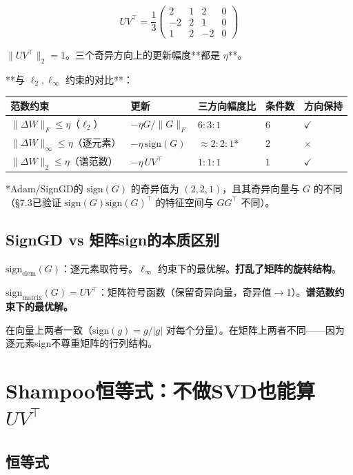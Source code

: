 \documentclass[12pt,a4paper]{article}
\begin{document}
\[UV^\top = \frac{1}{3}\begin{pmatrix}2&1&2&0\\-2&2&1&0\\1&2&-2&0\end{pmatrix}\]

$\|UV^\top\|_2 = 1$。三个奇异方向上的更新幅度**都是 $\eta$**。

**与 $\ell_2, \ell_\infty$ 约束的对比**：






\begin{center}\small
\begin{longtable}{|l|l|l|l|l|}
\hline
范数约束 & 更新 & 三方向幅度比 & 条件数 & 方向保持 \\
\hline
$\|\Delta W\|_F \le \eta$（$\ell_2$） & $-\eta G/\|G\|_F$ & $6:3:1$ & $6$ & $\checkmark$ \\
$\|\Delta W\|_\infty \le \eta$（逐元素） & $-\eta\,\text{sign}(G)$ & $\approx 2:2:1$* & $2$ & \textbf{$\times$} \\
$\|\Delta W\|_2 \le \eta$（谱范数） & $-\eta\,UV^\top$ & $1:1:1$ & $1$ & $\checkmark$ \\
\hline
\end{longtable}
\end{center}


*Adam/SignGD的 $\text{sign}(G)$ 的奇异值为 $(2,2,1)$，且其奇异向量与 $G$ 的不同（§7.3已验证 $\text{sign}(G)\text{sign}(G)^\top$ 的特征空间与 $GG^\top$ 不同）。


\subsection{SignGD vs 矩阵sign的本质区别}

$\text{sign}_{\text{elem}}(G)$：逐元素取符号。$\ell_\infty$ 约束下的最优解。\textbf{打乱了矩阵的旋转结构}。

$\text{sign}_{\text{matrix}}(G) = UV^\top$：矩阵符号函数（保留奇异向量，奇异值$\to$1）。\textbf{谱范数约束下的最优解。}

在向量上两者一致（$\text{sign}(g) = g/|g|$ 对每个分量）。在矩阵上两者不同——因为逐元素sign不尊重矩阵的行列结构。




\section{Shampoo恒等式：不做SVD也能算 $UV^\top$}


\subsection{恒等式}
\end{document}
